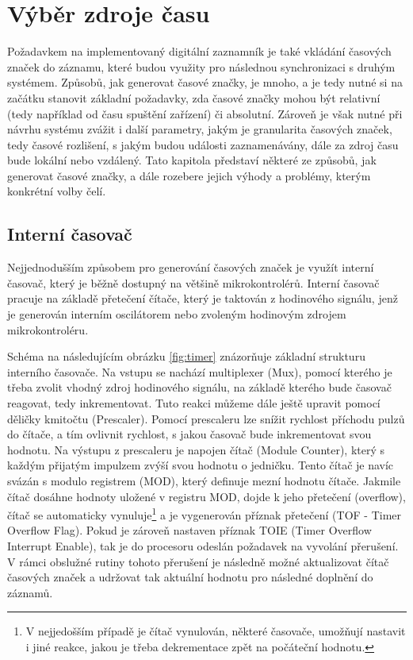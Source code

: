 \section{Výběr zdroje času}
\label{zdroje_casu}
Požadavkem na implementovaný digitální zaznamník  je také vkládání časových značek do záznamu, které budou využity pro následnou synchronizaci s druhým systémem. Způsobů, jak generovat časové značky, je mnoho, a je tedy nutné si na začátku stanovit základní požadavky, zda časové značky mohou být relativní (tedy například od času spuštění zařízení) či absolutní. Zároveň je však nutné při návrhu systému zvážit i další parametry, jakým je granularita časových značek, tedy časové rozlišení, s jakým budou události zaznamenávány, dále za zdroj času bude lokální nebo vzdálený. Tato kapitola představí některé ze způsobů, jak generovat časové značky, a dále rozebere jejich výhody a problémy, kterým konkrétní volby čelí. 

\subsection{Interní časovač}
Nejjednodušším způsobem pro generování časových značek je využít interní časovač, který je běžně dostupný na většině mikrokontrolérů. Interní časovač pracuje na základě přetečení čítače, který je taktován z hodinového signálu, jenž je generován interním oscilátorem nebo zvoleným hodinovým zdrojem mikrokontroléru. 

Schéma na následujícím obrázku \ref{fig:timer} znázorňuje základní strukturu interního časovače. Na vstupu se nachází multiplexer (Mux), pomocí kterého je třeba zvolit vhodný zdroj hodinového signálu, na základě kterého bude časovač reagovat, tedy inkrementovat. Tuto reakci můžeme dále ještě upravit pomocí děličky kmitočtu (Prescaler). Pomocí prescaleru lze snížit rychlost příchodu pulzů do čítače, a tím ovlivnit rychlost, s jakou časovač bude inkrementovat svou hodnotu. Na výstupu z prescaleru je napojen čítač (Module Counter), který s každým přijatým impulzem zvýší svou hodnotu o jedničku. Tento čítač je navíc svázán s modulo registrem (MOD), který definuje mezní hodnotu čítače. Jakmile čítač dosáhne hodnoty uložené v registru MOD, dojde k jeho přetečení (overflow), čítač se automaticky vynuluje\footnote{V nejjedošším případě je čítač vynulován, některé časovače, umožňují nastavit i jiné reakce, jakou je třeba dekrementace zpět na počáteční hodnotu.} a je vygenerován příznak přetečení (TOF - Timer Overflow Flag). Pokud je zároveň nastaven příznak TOIE (Timer Overflow Interrupt Enable), tak je do procesoru odeslán požadavek na vyvolání přerušení. V rámci obslužné rutiny tohoto přerušení je následně možné aktualizovat čítač časových značek a udržovat tak aktuální hodnotu pro následné doplnění do záznamů. 


